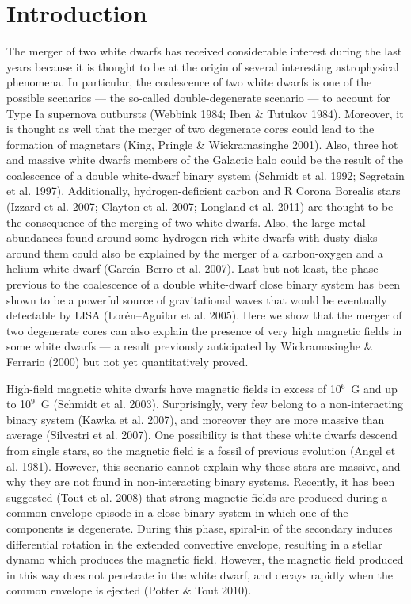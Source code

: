 \documentclass[]{emulateapj}
\begin{document}

\section{Introduction}
\label{intro}

The  merger of  two white  dwarfs has  received  considerable interest
during the  last years because  it is thought  to be at the  origin of
several  interesting  astrophysical  phenomena.   In  particular,  the
coalescence of two  white dwarfs is one of  the possible scenarios ---
the so-called  double-degenerate scenario ---  to account for  Type Ia
supernova outbursts  (Webbink 1984; Iben \&  Tutukov 1984).  Moreover,
it is  thought as well that  the merger of two  degenerate cores could
lead to  the formation of  magnetars (King, Pringle  \& Wickramasinghe
2001).   Also, three  hot  and  massive white  dwarfs  members of  the
Galactic  halo could  be the  result of  the coalescence  of  a double
white-dwarf  binary system  (Schmidt et  al.  1992;  Segretain  et al.
1997).  Additionally, hydrogen-deficient  carbon and R Corona Borealis
stars (Izzard et al. 2007; Clayton  et al. 2007; Longland et al. 2011)
are thought to be the consequence  of the merging of two white dwarfs.
Also, the large metal abundances found around some hydrogen-rich white
dwarfs with  dusty disks  around them could  also be explained  by the
merger of a carbon-oxygen and  a helium white dwarf (Garc\'\i a--Berro
et  al.   2007).   Last but  not  least,  the  phase previous  to  the
coalescence of a double white-dwarf close binary system has been shown
to  be  a  powerful  source  of  gravitational  waves  that  would  be
eventually detectable by LISA (Lor\'en--Aguilar et al. 2005).  Here we
show  that the merger  of two  degenerate cores  can also  explain the
presence  of very  high magnetic  fields in  some white  dwarfs  --- a
result previously anticipated by Wickramasinghe \& Ferrario (2000) but
not yet quantitatively proved.

High-field  magnetic white dwarfs  have magnetic  fields in  excess of
10$^6$~G and up to 10$^9$~G  (Schmidt et al. 2003). Surprisingly, very
few belong to a non-interacting binary system (Kawka et al. 2007), and
moreover they are  more massive than average (Silvestri  et al. 2007).
One possibility is that these  white dwarfs descend from single stars,
so the magnetic field is a  fossil of previous evolution (Angel et al.
1981).   However, this  scenario cannot  explain why  these  stars are
massive, and why they are not found in non-interacting binary systems.
Recently,  it  has been  suggested  (Tout  et  al. 2008)  that  strong
magnetic fields  are produced  during a common  envelope episode  in a
close  binary system  in which  one of  the components  is degenerate.
During  this phase,  spiral-in of  the secondary  induces differential
rotation in  the extended convective envelope, resulting  in a stellar
dynamo which produces the magnetic field.  However, the magnetic field
produced in this way does not penetrate in the white dwarf, and decays
rapidly when the common envelope is ejected (Potter \& Tout 2010).
\end{document}
